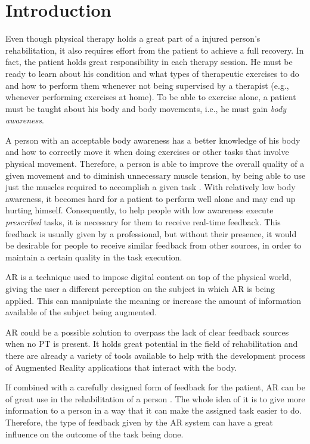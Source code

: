 \documentclass[runningheads]{llncs}
\begin{document}
\section{Introduction}
\label{section-intro}


Even though physical therapy holds a great part of a injured person's rehabilitation, 
it also requires effort from the patient to achieve a full recovery.
In fact, the patient holds great responsibility in each therapy session.
He must be ready to learn about his condition and what types of therapeutic exercises 
to do and how to perform them whenever not being supervised by a therapist (e.g., whenever performing exercises at home).
To be able to exercise alone, a patient must be taught about his body and body 
movements, i.e., he must gain \emph{body awareness}.

A person with an acceptable body awareness has a better knowledge of his body and how to correctly move it when doing exercises or other tasks that involve physical movement.
Therefore, a person is able to improve the overall quality of a given movement and to diminish unnecessary muscle tension, 
by being able to use just the muscles required to accomplish a given task \cite{Singh2014a}.
With relatively low body awareness, it becomes hard for a patient to perform well alone and may 
end up hurting himself. %
Consequently, to help people with low awareness 
execute \textit{prescribed} tasks, it is necessary for them to receive real-time feedback.
This feedback is usually given by a professional, 
but without their presence, it would be desirable for people to receive similar feedback from other sources, in order to maintain a certain quality in the task execution.

\ac{AR} is a technique used to impose digital content on top of the physical world,
giving the user a different perception on the subject in which \ac{AR} is being
applied. This can manipulate the meaning or increase the amount of information available
of the subject being augmented.

\ac{AR} could be a possible solution to overpass the lack of clear feedback sources when no \ac{PT} is present.
It holds great potential in the field of rehabilitation %
and there are already a variety of tools available to help with the development process of Augmented
Reality applications that interact with the body\cite{Gama2012a}.

If combined with a carefully designed form of feedback for the patient,
\ac{AR} can be of great use in the rehabilitation of a person \cite{Sigrist2013}. The whole 
idea of it is to give more information to a person in a way that it can make 
the assigned task easier to do.
Therefore, the type of feedback given by the \ac{AR} system can have a great influence 
on the outcome of the task being done.\cite{Causo2011}
\end{document}
